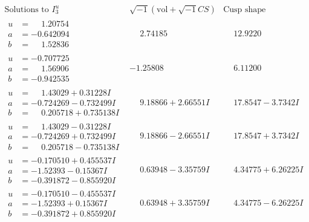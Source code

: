\documentclass[1p]{elsarticle_modified}
\theoremstyle{definition}
\newcommand{\I}{\sqrt{-1}}
\begin{document}
$$\begin{array}{c|c|c}  
\text{Solutions to }I^u_{3}& \I (\text{vol} + \sqrt{-1}CS) & \text{Cusp shape}\\
 \hline 
\begin{aligned}
u &= \phantom{-}1.20754\phantom{ +0.000000I} \\
a &= -0.642094\phantom{ +0.000000I} \\
b &= \phantom{-}1.52836\phantom{ +0.000000I}\end{aligned}
 & \phantom{-}2.74185\phantom{ +0.000000I} & \phantom{-}12.9220\phantom{ +0.000000I} \\ \hline\begin{aligned}
u &= -0.707725\phantom{ +0.000000I} \\
a &= \phantom{-}1.56906\phantom{ +0.000000I} \\
b &= -0.942535\phantom{ +0.000000I}\end{aligned}
 & -1.25808\phantom{ +0.000000I} & \phantom{-}6.11200\phantom{ +0.000000I} \\ \hline\begin{aligned}
u &= \phantom{-}1.43029 + 0.31228 I \\
a &= -0.724269 - 0.732499 I \\
b &= \phantom{-}0.205718 + 0.735138 I\end{aligned}
 & \phantom{-}9.18866 + 2.66551 I & \phantom{-}17.8547 - 3.7342 I \\ \hline\begin{aligned}
u &= \phantom{-}1.43029 - 0.31228 I \\
a &= -0.724269 + 0.732499 I \\
b &= \phantom{-}0.205718 - 0.735138 I\end{aligned}
 & \phantom{-}9.18866 - 2.66551 I & \phantom{-}17.8547 + 3.7342 I \\ \hline\begin{aligned}
u &= -0.170510 + 0.455537 I \\
a &= -1.52393 - 0.15367 I \\
b &= -0.391872 - 0.855920 I\end{aligned}
 & \phantom{-}0.63948 - 3.35759 I & \phantom{-}4.34775 + 6.26225 I \\ \hline\begin{aligned}
u &= -0.170510 - 0.455537 I \\
a &= -1.52393 + 0.15367 I \\
b &= -0.391872 + 0.855920 I\end{aligned}
 & \phantom{-}0.63948 + 3.35759 I & \phantom{-}4.34775 - 6.26225 I \\ \hline\begin{aligned}

\end{aligned}
\end{array}$$
\end{document}
